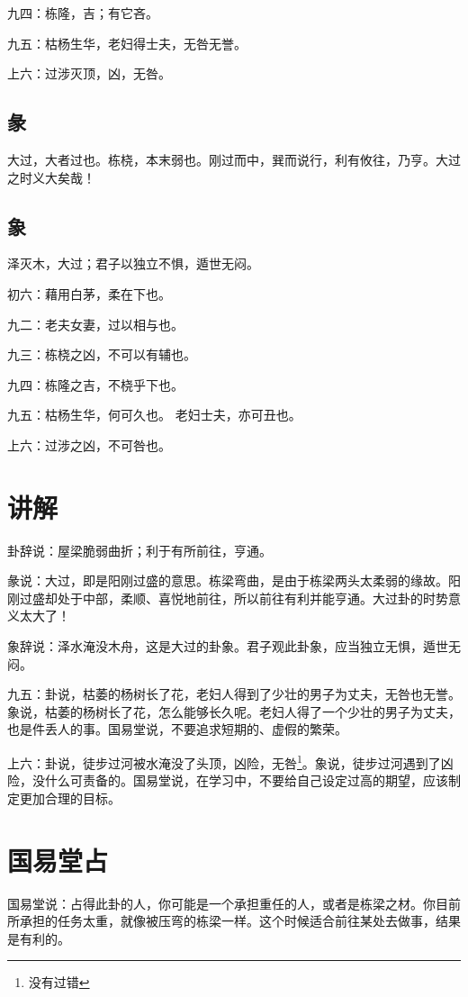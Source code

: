 \documentclass[12pt,oneside]{book}
\begin{document}
九四：栋隆，吉；有它吝。

九五：枯杨生华，老妇得士夫，无咎无誉。

上六：过涉灭顶，凶，无咎。

\subsection{彖}
大过，大者过也。栋桡，本末弱也。刚过而中，巽而说行，利有攸往，乃亨。大过之时义大矣哉！

\subsection{象}
泽灭木，大过；君子以独立不惧，遁世无闷。

初六：藉用白茅，柔在下也。

九二：老夫女妻，过以相与也。

九三：栋桡之凶，不可以有辅也。

九四：栋隆之吉，不桡乎下也。

九五：枯杨生华，何可久也。 老妇士夫，亦可丑也。

上六：过涉之凶，不可咎也。

\section{讲解}
卦辞说：屋梁脆弱曲折；利于有所前往，亨通。

彖说：大过，即是阳刚过盛的意思。栋梁弯曲，是由于栋梁两头太柔弱的缘故。阳刚过盛却处于中部，柔顺、喜悦地前往，所以前往有利并能亨通。大过卦的时势意义太大了！

象辞说：泽水淹没木舟，这是大过的卦象。君子观此卦象，应当独立无惧，遁世无闷。

九五：卦说，枯萎的杨树长了花，老妇人得到了少壮的男子为丈夫，无咎也无誉。象说，枯萎的杨树长了花，怎么能够长久呢。老妇人得了一个少壮的男子为丈夫，也是件丢人的事。国易堂说，不要追求短期的、虚假的繁荣。

上六：卦说，徒步过河被水淹没了头顶，凶险，无咎\footnote{没有过错}。象说，徒步过河遇到了凶险，没什么可责备的。国易堂说，在学习中，不要给自己设定过高的期望，应该制定更加合理的目标。

\section{国易堂占}
国易堂说：占得此卦的人，你可能是一个承担重任的人，或者是栋梁之材。你目前所承担的任务太重，就像被压弯的栋梁一样。这个时候适合前往某处去做事，结果是有利的。
\end{document}
